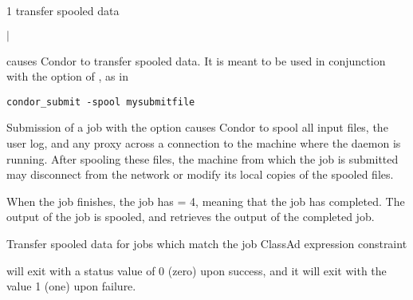 \begin{ManPage}{\label{man-condor-transfer-data}}{1}
{transfer spooled data}
\Synopsis {}
\ToolArgsBase

\ToolLocate
\ToolJobs
$|$  \Dots

\ToolLocate
\ToolAll


\Description
{} causes Condor to transfer spooled
data.
It is meant to be used in conjunction with the 
option of , as in
\footnotesize
\begin{verbatim}
condor_submit -spool mysubmitfile
\end{verbatim}
\normalsize
Submission of a job with the  option causes Condor
to spool all input files, the user log, and any proxy across
a connection to the machine where the  daemon
is running.
After spooling these files,
the machine from which the job is submitted may
disconnect from the network
or modify its local copies of the spooled files.

When the job finishes,
the job has  = 4, meaning that the job has
completed.
The output of the job is spooled,
and
 retrieves the output of the completed
job.



\begin{Options}
  \ToolArgsBaseDesc
  \ToolLocateDesc
   {Transfer spooled data for
  jobs which match the job ClassAd expression constraint}
\end{Options}

\ExitStatus

 will exit with a status value of 0 (zero) upon success,
and it will exit with the value 1 (one) upon failure.

\end{ManPage}

